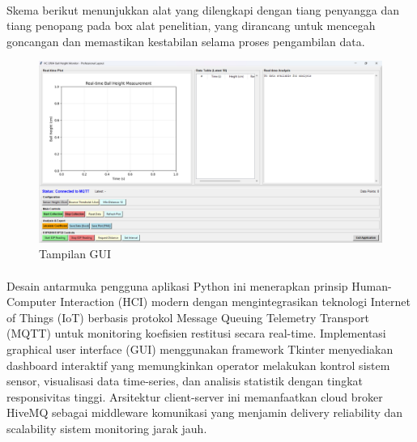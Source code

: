 \paragraph{}Skema berikut menunjukkan alat yang dilengkapi dengan tiang penyangga dan tiang penopang pada box alat penelitian, yang dirancang untuk mencegah goncangan dan memastikan kestabilan selama proses pengambilan data.
\begin{figure}
    \centering
    \includegraphics[width =\textwidth]{images/Tampilan GUI.png}
    \caption{Tampilan GUI}
    \label{fig:tampilan_gui}
\end{figure}
\paragraph{}Desain antarmuka pengguna aplikasi Python ini menerapkan prinsip Human-Computer Interaction (HCI) modern dengan mengintegrasikan teknologi Internet of Things (IoT) berbasis protokol Message Queuing Telemetry Transport (MQTT) untuk monitoring koefisien restitusi secara real-time. Implementasi graphical user interface (GUI) menggunakan framework Tkinter menyediakan dashboard interaktif yang memungkinkan operator melakukan kontrol sistem sensor, visualisasi data time-series, dan analisis statistik dengan tingkat responsivitas tinggi. Arsitektur client-server ini memanfaatkan cloud broker HiveMQ sebagai middleware komunikasi yang menjamin delivery reliability dan scalability sistem monitoring jarak jauh.

